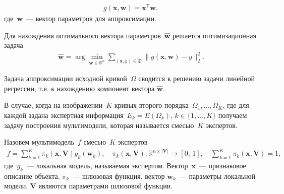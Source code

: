 \documentclass[12pt]{a&t}
\begin{document}
\begin{gather}
	g(\mathbf{x}, \mathbf{w}) = \mathbf{x}^\mathsf{T} \mathbf{w},
\end{gather} 
где~$\mathbf{w}$~--- вектор параметров для аппроксимации.

Для нахождения оптимального вектора параметров~$\hat{\mathbf {w}}$ решается оптимизационная задача
\begin{gather}
	\hat{\mathbf{w}} = \arg\min_{\mathbf{w}\in\mathbb{R}^n} \sum_{\left(\mathbf{x}, y\right) \in \mathfrak{D}}\|g(\mathbf{x}, \mathbf{w}) - y \|_2^2.
\end{gather} 

Задача аппроксимации исходной кривой~$\Omega$ сводится к решению задачи линейной регрессии, т.е. к нахождению компонент вектора $\hat{\mathbf{w}}$.

В случае, когда на изображении~$K$ кривых второго порядка~$\Omega_1, \dots, \Omega_K$, где для каждой задана экспертная информация~$E_k = E(\Omega_k), \, k \in \{1, \dots, K\}$ получаем задачу построения мультимодели, которая называется смесью~$K$ экспертов.

\begin{definition}
Назовем мультимодель~$f$ смесью~$K$ экспертов
\begin{gather}
	f = \sum\limits_{k = 1}^{K}\pi_k(\mathbf{x}, \mathbf{V})g_k(\mathbf{w}_k),  \quad \pi_k(\mathbf{x}, \mathbf{V}): \mathbb{R}^{n\times |\mathbf{V}|} \rightarrow [0, \, 1], \quad \sum\limits_{k = 1}^{K}\pi_k(\mathbf{x}, \mathbf{V}) = 1, 
\end{gather}
где~$g_k$~--- локальная модель, называемая экспертом. Вектор~$\mathbf{x}$~--- признаковое описание объекта, $\pi_k$~--- шлюзовая функция, вектор $\mathbf{w}_k$~--- параметры локальной модели, $\mathbf{V}$ являются параметрами шлюзовой функции.
\end{definition}
\end{document}
